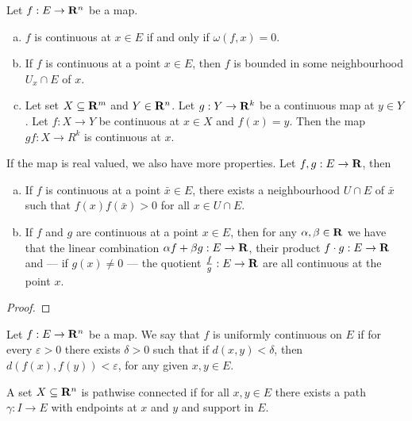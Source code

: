 \begin{proposition}
  Let \(f: E \to \mathbf{R}^n\) be a map.
  \begin{enumerate}[(a)]
    \item \(f\) is continuous at \(x \in E\) if and only if \(\omega(f, x) =
      0\).
    \item If \(f\) is continuous at a point \(x \in E\), then \(f\) is bounded
      in some neighbourhood \(U_x \cap E\) of \(x\).
    \item Let set \(X \subseteq \mathbf{R}^m\) and \(Y \in \mathbf{R}^n\). Let \(g: Y \to \mathbf{R}^k\)
      be a continuous map at \(y \in Y\). Let \(f: X \to Y\) be continuous at
      \(x \in X\) and \(f(x) = y\). Then the map \(g  f: X \to R^k\) is
      continuous at \(x\).
  \end{enumerate}
  If the map is real valued, we also have more properties. Let \(f, g: E \to
  \mathbf{R}\), then
  \begin{enumerate}[(a)]
    \item If \(f\) is continuous at a point \(\bar x \in E\), there exists a
      neighbourhood \(U \cap E\) of \(\bar x\) such that \(f(x)f(\bar x) > 0\)
      for all \(x \in U \cap E\).
    \item If \(f\) and \(g\) are continuous at a point \(x \in E\), then for any
      \(\alpha, \beta \in \mathbf{R}\) we have that the linear combination \(\alpha f +
      \beta g: E \to \mathbf{R}\), their product \(f \cdot g: E \to \mathbf{R}\) and --- if \(g(x)
      \neq 0\) --- the quotient \(\frac f g: E \to \mathbf{R}\) are all continuous at
      the point \(x\).
  \end{enumerate}
\end{proposition}

\begin{proof}
\end{proof}

\begin{definition}
  Let \(f: E \to \mathbf{R}^n\) be a map. We say that \(f\) is uniformly continuous on
  \(E\) if for every \(\varepsilon > 0\) there exists \(\delta > 0\) such that
  if \(d(x, y) < \delta\), then \(d(f(x), f(y)) < \varepsilon\), for any given
  \(x, y \in E\).
\end{definition}

\begin{definition}\label{def: path-connected}
  A set \(X \subseteq \mathbf{R}^n\) is pathwise connected if for all \(x, y \in E\)
  there exists a path \(\gamma: I \to E\) with endpoints at \(x\) and \(y\) and
  support in \(E\).
\end{definition}

